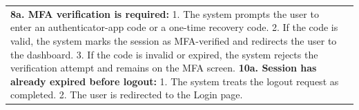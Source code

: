 \begin{longtable}{|>{\raggedright\arraybackslash}p{}|>{\raggedright\arraybackslash}p{}|}
\textbf{8a. MFA verification is required:} \newline
\hspace*{1em}1. The system prompts the user to enter an authenticator-app code or a one-time recovery code. \newline
\hspace*{1em}2. If the code is valid, the system marks the session as MFA-verified and redirects the user to the dashboard. \newline
\hspace*{1em}3. If the code is invalid or expired, the system rejects the verification attempt and remains on the MFA screen. \newline
\textbf{10a. Session has already expired before logout:} \newline
\hspace*{1em}1. The system treats the logout request as completed. \newline
\hspace*{1em}2. The user is redirected to the Login page. \\
\end{longtable}


